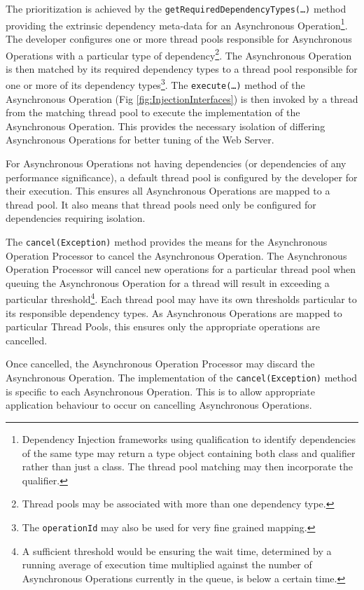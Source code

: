 \documentclass[prodmode]{style/acmlarge}
\begin{document}
The prioritization is achieved by the
\texttt{getRequiredDependencyTypes(\ldots)} method providing the extrinsic
dependency meta-data for an Asynchronous Operation\footnote{Dependency Injection
frameworks using qualification to identify dependencies of the same type may
return a type object containing both class and qualifier rather than just a
class.  The thread pool matching may then incorporate the qualifier.}.
The developer configures one or more thread pools responsible for Asynchronous
Operations with a particular type of dependency\footnote{Thread pools may be
associated with more than one dependency type.}.  The Asynchronous Operation is
then matched by its required dependency types to a thread pool responsible for
one or more of its dependency types\footnote{The \texttt{operationId} may also
be used for very fine grained mapping.}.  The \texttt{execute(\ldots)} method of
the Asynchronous Operation (Fig \ref{fig:InjectionInterfaces}) is then invoked
by a thread from the matching thread pool to execute the implementation of the
Asynchronous Operation.  This provides the necessary isolation of differing
Asynchronous Operations for better tuning of the Web Server.

For Asynchronous Operations not having dependencies (or dependencies of any
performance significance), a default thread pool is configured by the developer
for their execution.  This ensures all Asynchronous Operations are mapped to a
thread pool.  It also means that thread pools need only be configured for
dependencies requiring isolation.

The \texttt{cancel(Exception)} method provides the means for the Asynchronous
Operation Processor to cancel the Asynchronous Operation.  The Asynchronous
Operation Processor will cancel new operations for a particular thread pool when
queuing the Asynchronous Operation for a thread will result in exceeding a
particular threshold\footnote{A sufficient threshold would be ensuring the wait
time, determined by a running average of execution time multiplied against the
number of Asynchronous Operations currently in the queue, is below a certain
time.}.  Each thread pool may have its own thresholds particular to its
responsible dependency types.  As Asynchronous Operations are mapped to
particular Thread Pools, this ensures only the appropriate operations are
cancelled.

Once cancelled, the Asynchronous Operation Processor may discard the
Asynchronous Operation.  The implementation of the \texttt{cancel(Exception)}
method is specific to each Asynchronous Operation.  This is to allow appropriate
application behaviour to occur on cancelling Asynchronous Operations.
\end{document}
